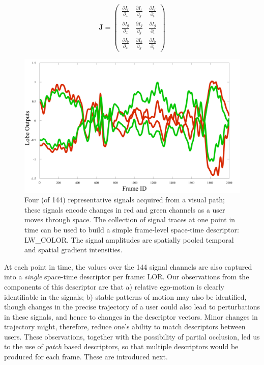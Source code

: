 \begin{equation}
\mathbf{J} = \left (
\begin{array}{ccc}
\frac{\partial I_r}{\partial_x} & \frac{\partial I_r}{\partial_y}   & \frac{\partial I_r}{\partial_t} \\
\frac{\partial I_g}{\partial_x}   & \frac{\partial I_g}{\partial_y}  &  \frac{\partial I_g}{\partial_t} \\
\frac{\partial I_b}{\partial_x}  & \frac{\partial  I_b}{\partial_y}  &  \frac{\partial I_b}{\partial_t} 
\end{array} 
\right )
\label{eq:CJ}
\end{equation}

\begin{figure}
\begin{center}
\includegraphics[width=\linewidth]{./gfx/Chapter04/Lobe1and6_red_green.pdf}
\caption{Four (of 144) representative signals acquired from a visual path; these signals encode changes in red and green channels as a user moves through space.  The collection of signal traces at one point in time can be used to build a simple frame-level space-time descriptor: LW\_COLOR. The signal amplitudes are spatially pooled temporal and spatial gradient intensities.}
\label{fig:Traces}
\end{center}
\end{figure}

At each point in time, the values over the 144 signal channels are also captured into a {\it single} space-time descriptor per frame: 
LOR.  Our observations from the components of this descriptor are that a) relative ego-motion is clearly identifiable in the signals; b) stable patterns of motion may also be identified, though changes in the precise trajectory of a user could also lead to perturbations in these signals, and hence to changes in the descriptor vectors. Minor changes in trajectory might, therefore, reduce one's ability to match descriptors between users.  These observations, together with the possibility of partial occlusion, led us to the use of {\em patch} based descriptors, so that multiple descriptors would be produced for each frame. These are introduced next.


